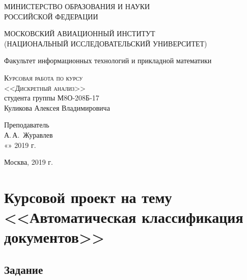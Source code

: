 \documentclass[12pt,a4paper]{scrartcl}
\begin{document}
\begin{titlepage}
  \begin{center}
    \large
    МИНИСТЕРСТВО ОБРАЗОВАНИЯ И НАУКИ\\ РОССИЙСКОЙ ФЕДЕРАЦИИ
     
 \vspace{0.25cm}
    МОСКОВСКИЙ АВИАЦИОННЫЙ ИНСТИТУТ \\
    (НАЦИОНАЛЬНЫЙ ИССЛЕДОВАТЕЛЬСКИЙ УНИВЕРСИТЕТ)
    \vspace{0.25cm}
     
    Факультет информационных технологий и прикладной математики

     
     
     \vfill

      \vfill
    \textsc{Курсовая работа по курсу\\ <<Дискретный анализ>>}\\[5mm]
    студента группы М8О-208Б-17 \\
    Куликова Алексея Владимировича
    \vfill

\end{center}
 
\newlength{\ML}

\vfill
 
\hfill\begin{minipage}{0.5\textwidth}
  Преподаватель\\
  \underline{\hspace{\ML}} А.\,А.~Журавлев\\
  «\underline{\hspace{0.7cm}}» \underline{\hspace{2cm}} 2019 г.
\end{minipage}%

\vspace{3cm}
 
\begin{center}
\vfill
\vfill
  Москва, 2019 г.
\end{center}
\end{titlepage}

\section*{Курсовой проект на тему <<Автоматическая классификация документов>>}
\subsection*{Задание}
\end{document}
